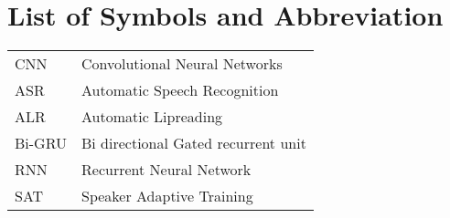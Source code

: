 				\chapter*{List of Symbols and Abbreviation}
			\endgroup
		\normalsize
		\begin{tabular}{p{1in}p{3in}}
		 CNN & Convolutional Neural Networks\\
		 ASR & Automatic Speech Recognition\\
		 ALR & Automatic Lipreading\\
		 Bi-GRU & Bi directional Gated recurrent unit\\
		 RNN & Recurrent Neural Network\\
		 SAT & Speaker Adaptive Training
		 
		\end{tabular}
		\pagebreak